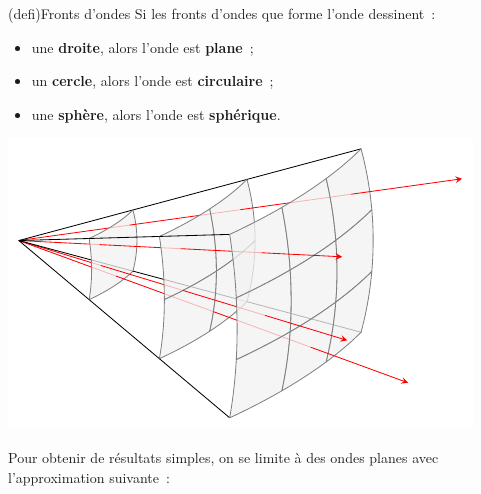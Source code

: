 \documentclass[../../main/main.tex]{subfiles}
\begin{document}
\begin{tcb}[sidebyside, righthand ratio=.5](defi){Fronts d'ondes}
	Si les fronts d'ondes que forme l'onde dessinent~:
	\begin{itemize}
		\item une \textbf{droite}, alors l'onde est \textbf{plane}~;
		\item un \textbf{cercle}, alors l'onde est \textbf{circulaire}~;
		\item une \textbf{sphère}, alors l'onde est \textbf{sphérique}.
	\end{itemize}
	\tcblower
	\begin{center}
		\includegraphics[width=.75\linewidth]{wave_3d_sph}
	\end{center}
\end{tcb}

Pour obtenir de résultats simples, on se limite à des ondes planes avec
l'approximation suivante~:
\end{document}

